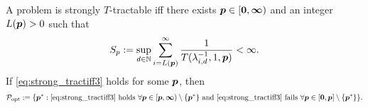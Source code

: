 \documentclass[11pt,a4paper]{article}
\begin{document}
\begin{theorem}\label{thm_main_strong_tract2}
A problem is strongly $T$-tractable iff there exists $\boldsymbol{p} \in [\boldsymbol{0}, \boldsymbol{\infty})$ and an integer $L(\boldsymbol{p}) > 0$ such that
\begin{equation} \label{eq:strong_tractiff3}
     S_p:=\sup_{d \in \mathbb{N}} \sum_{i = L(\boldsymbol{p})}^\infty \frac{1}{T(\lambda_{i,d}^{-1},1,\boldsymbol{p})} < \infty.
\end{equation}
If \eqref{eq:strong_tractiff3} holds for some $\boldsymbol{p}$, then
\[
	\mathcal{P}_{\text{opt}} : = \{\boldsymbol{p}^* : \eqref{eq:strong_tractiff3} \text{ holds }\forall \boldsymbol{p} \in [\boldsymbol{p},\boldsymbol{\infty}) \setminus \{\boldsymbol{p}^*\} \text{ and }
\eqref{eq:strong_tractiff3} \text{ fails } \forall \boldsymbol{p} \in [\boldsymbol{0},\boldsymbol{p}] \setminus \{\boldsymbol{p}^*\} \}.
\]
\end{theorem}
\end{document}
